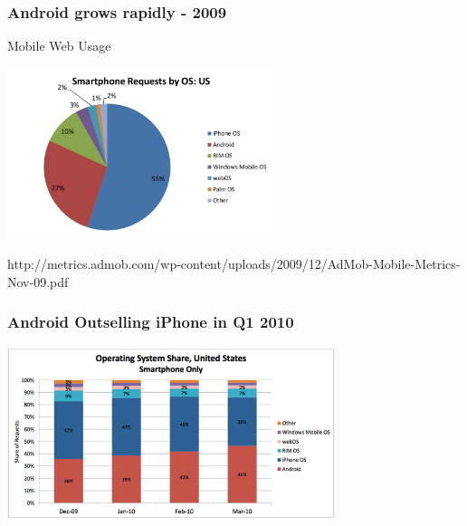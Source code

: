 \documentclass{beamer}
\begin{document}
\begin{frame}
\frametitle{Android grows rapidly - 2009}

\begin{center}
\begin{large}
 Mobile Web Usage
\end{large}

\hspace{0.2cm}

\includegraphics[height=5.0cm]{figs/admob-android-2009}


                  {http://metrics.admob.com/wp-content/uploads/2009/12/AdMob-Mobile-Metrics-Nov-09.pdf}

\end{center}

\end{frame}

\begin{frame}
\frametitle{Android Outselling iPhone in Q1 2010}

\begin{center}
\hspace{0.2cm}

\includegraphics[height=5.0cm]{figs/iphoneosvsandroid-marzo}

\hspace{0.2cm}
\end{center}

\end{frame}
\end{document}
